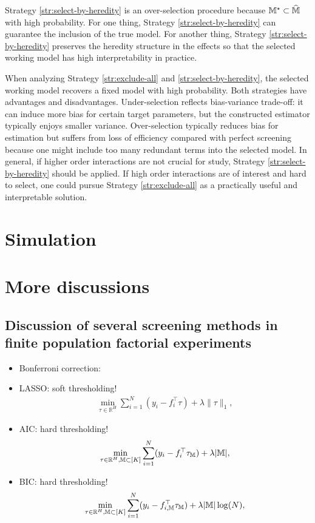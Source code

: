 \documentclass[12pt]{article}
\begin{document}
Strategy \ref{str:select-by-heredity} is an over-selection procedure because ${\mathbb{M}}^\star\subset\widehat{{\mathbb{M}}}$ with high probability. For one thing, Strategy \ref{str:select-by-heredity} can guarantee the inclusion of the true model. For another thing, Strategy \ref{str:select-by-heredity} preserves the heredity structure in the effects so that the selected working model has high interpretability in practice.  


When analyzing Strategy \ref{str:exclude-all} and \ref{str:select-by-heredity},  the selected working model recovers a fixed model with high probability. Both strategies have advantages and disadvantages. Under-selection reflects bias-variance trade-off: it can induce more bias for certain target parameters, but the constructed estimator typically enjoys smaller variance. Over-selection typically reduces bias for estimation but suffers from loss of efficiency compared with perfect screening because one might include too many redundant terms into the selected model. In general, if higher order interactions are not crucial for study, Strategy \ref{str:select-by-heredity} should be applied. If high order interactions are of interest and hard to select, one could pursue Strategy \ref{str:exclude-all} as a practically useful and interpretable solution.

\section{Simulation}

\section{More discussions}

\subsection{Discussion of several  screening methods in finite population factorial experiments}
\begin{itemize}
\item Bonferroni correction:

\item LASSO: {\color{red} soft thresholding!}
\begin{align*}
    \min_{\tau \in \mathbb{R}^H}\sum_{i= 1}^N (y_i - f_i^\top \tau) + \lambda \|\tau\|_1,
\end{align*}

\item AIC: {\color{red} hard thresholding!}
\begin{align*}
    \min_{\tau \in \mathbb{R}^H,{\mathbb{M}}\subset [K]}\sum_{i= 1}^N (y_i - f_i^\top \tau_{{\mathbb{M}}}) + \lambda |{\mathbb{M}}|,
\end{align*}

\item BIC: {\color{red} hard thresholding!}
\begin{align*}
    \min_{\tau \in \mathbb{R}^H, {\mathbb{M}}\subset [K]}\sum_{i= 1}^N (y_i - f_{i,{\mathbb{M}}}^\top \tau_{{\mathbb{M}}}) + \lambda |{\mathbb{M}}| \log(N),
\end{align*}
\end{itemize}
\end{document}
